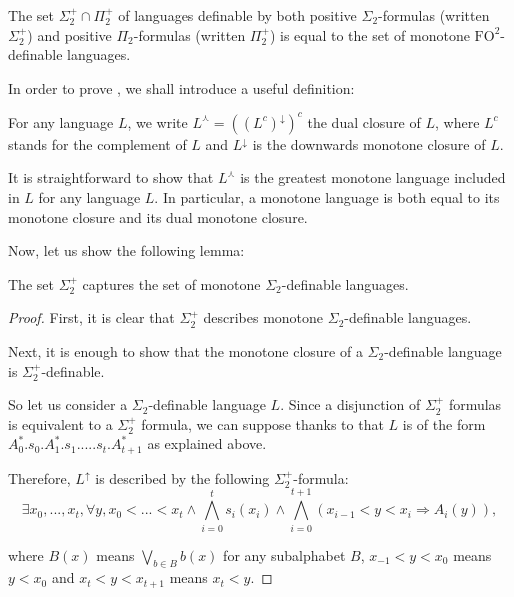 \documentclass[a4paper,UKenglish,cleveref, autoref, thm-restate]{lipics-v2021}
\newcommand{\dualmon}{\curlywedge}
\newcommand{\FO}{\mathrm{FO}}
\newcommand{\FOtw}{\FO^2}
\begin{document}
\begin{theorem} \label{thm:sigpimon}
    The set $\Sigma_2^+ \cap \Pi_2^+$ of languages definable by both positive $\Sigma_2$-formulas (written $\Sigma_2^+$) and positive $\Pi_2$-formulas (written $\Pi_2^+$) is equal to the set of monotone $\FOtw$-definable languages.
\end{theorem}


In order to prove , we shall introduce a useful definition:

\begin{definition}
    For any language $L$, we write $L^{\dualmon} = ((L^c)^\downarrow)^c$ the dual closure of $L$, where $L^c$ stands for the complement of $L$ and $L^\downarrow$ is the downwards monotone closure of $L$.
\end{definition}

\begin{remark}\label{rmk:monclos}
    It is straightforward to show that $L^{\dualmon}$ is the greatest monotone language included in $L$ for any language $L$.
    In particular, a monotone language is both equal to its monotone closure and its dual monotone closure.
\end{remark}


Now, let us show the following lemma:

\begin{lemma}\label{lem:sig2+}
    The set $\Sigma_2^+$ captures the set of monotone $\Sigma_2$-definable languages.
\end{lemma}

\begin{proof}
    First, it is clear that $\Sigma_2^+$ describes monotone $\Sigma_2$-definable languages.

    Next, it is enough to show that the monotone closure of a $\Sigma_2$-definable language is $\Sigma_2^+$-definable.

    So let us consider a $\Sigma_2$-definable language $L$.
Since a disjunction of $\Sigma_2^+$ formulas is equivalent to a $\Sigma_2^+$ formula, we can suppose thanks to \cite{PolynomialClosure} that $L$ is of the form $A_0^*.s_0.A_1^*.s_1.....s_t.A_{t+1}^*$ as explained above.

    Therefore, $L^\uparrow$ is described by the following $\Sigma_2^+$-formula:
    $$
        \exists x_0,...,x_t, \forall y, x_0 < ... < x_t \land \bigwedge_{i=0}^t s_i(x_i)
\land \bigwedge_{i=0}^{t+1} ( x_{i-1}<y<x_i \Rightarrow A_i(y)),
$$

    where $B(x)$ means $\bigvee_{b \in B} b(x)$ for any subalphabet $B$, $x_{-1} < y < x_0$ means $y<x_0$ and $x_t < y < x_{t+1}$ means $x_t < y$.



\end{proof}
\end{document}
